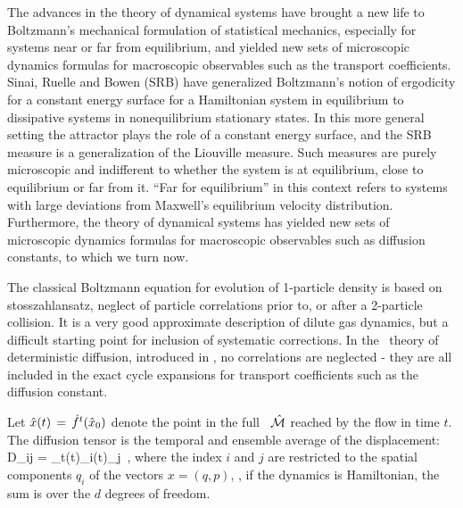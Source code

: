 


The advances in the theory of dynamical systems have brought a new
life to Boltzmann's mechanical formulation of statistical mechanics,
especially for systems near or far from equilibrium, and yielded new
sets of microscopic dynamics formulas for macroscopic observables such
as the transport coefficients. Sinai, Ruelle and Bowen (SRB) have
generalized Boltzmann's notion of ergodicity for a constant energy
surface for a Hamiltonian system in equilibrium to dissipative systems
in {nonequilibrium} stationary states. In this
more general setting the attractor plays the role of a constant energy
surface, and the SRB measure is a generalization of the Liouville
measure. Such measures are purely microscopic and indifferent to
whether the system is at equilibrium, close to equilibrium or far from
it. ``Far for equilibrium'' in this context refers to systems with
large deviations from Maxwell's equilibrium velocity distribution.
Furthermore, the theory of dynamical systems has yielded new sets of
microscopic dynamics formulas for macroscopic observables such as
diffusion constants, to which we turn now.

The classical Boltzmann equation for evolution of 1-particle density
is based on stosszahlansatz, neglect of particle correlations prior
to, or after a 2-particle collision. It is a very good approximate
description of dilute gas dynamics, but a difficult starting point for
inclusion of systematic corrections. In the \po\ theory of
deterministic diffusion, introduced in
, no correlations are neglected -
they are all included in the exact cycle expansions for transport
coefficients such as the diffusion constant.

Let $\hat x(t)\,=\,{\hat{f}^{t}(\hat x_0)}$ denote the point in the full
\statesp\ $\hat {{\cal M}}$ reached by the flow in time $t$. The diffusion tensor
is the temporal and ensemble average of the displacement: \beq D_{ij}
= 
\lim_{t\to\infty}\left\langle\hx(t)_i\hx(t)_j\right\rangle
 \,, \label{eq-diff-def} \eeq where the index $i$ and $j$ are 
restricted to the spatial components $q_i$ of the {\statesp} vectors 
$x=(q,p)$, \ie, if the dynamics is Hamiltonian, the sum is over the 
$d$ degrees of freedom.

